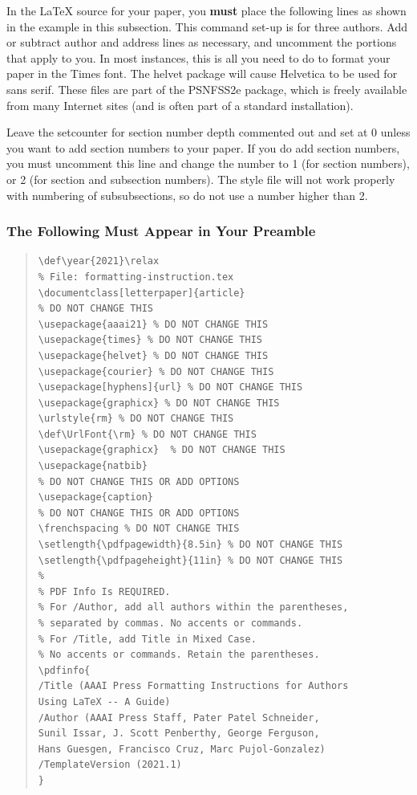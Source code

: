 \documentclass[letterpaper]{article} %
\def\UrlFont{\rm}  %
\begin{document}
In the \LaTeX{} source for your paper, you \textbf{must} place the following lines as shown in the example in this subsection. This command set-up is for three authors. Add or subtract author and address lines as necessary, and uncomment the portions that apply to you. In most instances, this is all you need to do to format your paper in the Times font. The helvet package will cause Helvetica to be used for sans serif. These files are part of the PSNFSS2e package, which is freely available from many Internet sites (and is often part of a standard installation).

Leave the setcounter for section number depth commented out and set at 0 unless you want to add section numbers to your paper. If you do add section numbers, you must uncomment this line and change the number to 1 (for section numbers), or 2 (for section and subsection numbers). The style file will not work properly with numbering of subsubsections, so do not use a number higher than 2.

\subsubsection{The Following Must Appear in Your Preamble}
\begin{quote}
\begin{scriptsize}\begin{verbatim}
\def\year{2021}\relax
% File: formatting-instruction.tex
\documentclass[letterpaper]{article}
% DO NOT CHANGE THIS
\usepackage{aaai21} % DO NOT CHANGE THIS
\usepackage{times} % DO NOT CHANGE THIS
\usepackage{helvet} % DO NOT CHANGE THIS
\usepackage{courier} % DO NOT CHANGE THIS
\usepackage[hyphens]{url} % DO NOT CHANGE THIS
\usepackage{graphicx} % DO NOT CHANGE THIS
\urlstyle{rm} % DO NOT CHANGE THIS
\def\UrlFont{\rm} % DO NOT CHANGE THIS
\usepackage{graphicx}  % DO NOT CHANGE THIS
\usepackage{natbib}
% DO NOT CHANGE THIS OR ADD OPTIONS
\usepackage{caption}
% DO NOT CHANGE THIS OR ADD OPTIONS
\frenchspacing % DO NOT CHANGE THIS
\setlength{\pdfpagewidth}{8.5in} % DO NOT CHANGE THIS
\setlength{\pdfpageheight}{11in} % DO NOT CHANGE THIS
%
% PDF Info Is REQUIRED.
% For /Author, add all authors within the parentheses,
% separated by commas. No accents or commands.
% For /Title, add Title in Mixed Case.
% No accents or commands. Retain the parentheses.
\pdfinfo{
/Title (AAAI Press Formatting Instructions for Authors
Using LaTeX -- A Guide)
/Author (AAAI Press Staff, Pater Patel Schneider,
Sunil Issar, J. Scott Penberthy, George Ferguson,
Hans Guesgen, Francisco Cruz, Marc Pujol-Gonzalez)
/TemplateVersion (2021.1)
}
\end{verbatim}\end{scriptsize}
\end{quote}
\end{document}

